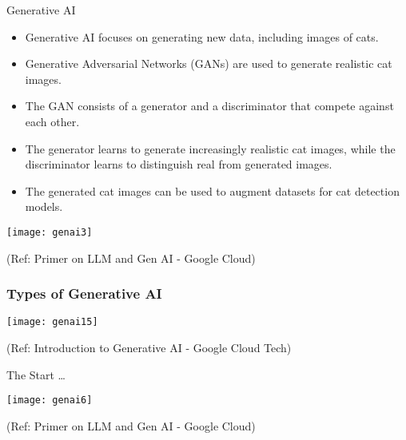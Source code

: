 \begin{frame}[fragile]{Generative AI}
  \begin{itemize}
    \item Generative AI focuses on generating new data, including images of cats.
    \item Generative Adversarial Networks (GANs) are used to generate realistic cat images.
    \item The GAN consists of a generator and a discriminator that compete against each other.
    \item The generator learns to generate increasingly realistic cat images, while the discriminator learns to distinguish real from generated images.
    \item The generated cat images can be used to augment datasets for cat detection models.
  \end{itemize}
  
\begin{center}
\texttt{[image: genai3]}
\end{center}

{\tiny (Ref: Primer on LLM and Gen AI - Google Cloud)}
  
\end{frame}

\begin{frame}[fragile]\frametitle{Types of  Generative AI}

\begin{center}
\texttt{[image: genai15]}
\end{center}


{\tiny (Ref: Introduction to Generative AI - Google Cloud Tech)}

\end{frame}

\begin{frame}[fragile]{The Start \ldots}

\begin{center}
\texttt{[image: genai6]}
\end{center}

{\tiny (Ref: Primer on LLM and Gen AI - Google Cloud)}
  
\end{frame}

